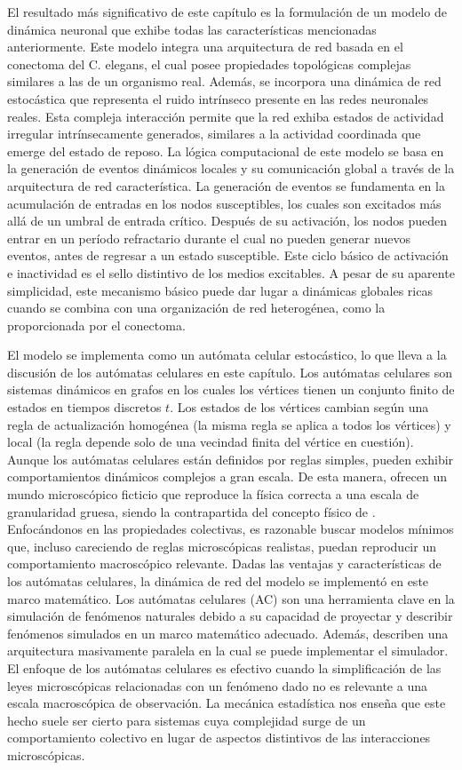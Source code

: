 El resultado más significativo de este capítulo es la formulación de un modelo de dinámica neuronal que exhibe todas las características mencionadas anteriormente. Este modelo integra una arquitectura de red basada en el conectoma del C. elegans, el cual posee propiedades topológicas complejas similares a las de un organismo real. Además, se incorpora una dinámica de red estocástica que representa el ruido intrínseco presente en las redes neuronales reales. Esta compleja interacción permite que la red exhiba estados de actividad irregular intrínsecamente generados, similares a la actividad coordinada que emerge del estado de reposo. La lógica computacional de este modelo se basa en la generación de eventos dinámicos locales y su comunicación global a través de la arquitectura de red característica. La generación de eventos se fundamenta en la acumulación de entradas en los nodos susceptibles, los cuales son excitados más allá de un umbral de entrada crítico. Después de su activación, los nodos pueden entrar en un período refractario durante el cual no pueden generar nuevos eventos, antes de regresar a un estado susceptible. Este ciclo básico de activación e inactividad es el sello distintivo de los medios excitables. A pesar de su aparente simplicidad, este mecanismo básico puede dar lugar a dinámicas globales ricas cuando se combina con una organización de red heterogénea, como la proporcionada por el conectoma.

El modelo se implementa como un autómata celular estocástico, lo que lleva a la discusión de los autómatas celulares en este capítulo. Los autómatas celulares son sistemas dinámicos en grafos en los cuales los vértices tienen un conjunto finito de estados en tiempos discretos $t$. Los estados de los vértices cambian según una regla de actualización homogénea (la misma regla se aplica a todos los vértices) y local (la regla depende solo de una vecindad finita del vértice en cuestión). Aunque los autómatas celulares están definidos por reglas simples, pueden exhibir comportamientos dinámicos complejos a gran escala. De esta manera, ofrecen un mundo microscópico ficticio que reproduce la física correcta a una escala de granularidad gruesa, siendo la contrapartida del concepto físico de . Enfocándonos en las propiedades colectivas, es razonable buscar modelos mínimos que, incluso careciendo de reglas microscópicas realistas, puedan reproducir un comportamiento macroscópico relevante. Dadas las ventajas y características de los autómatas celulares, la dinámica de red del modelo se implementó en este marco matemático. Los autómatas celulares (AC) son una herramienta clave en la simulación de fenómenos naturales debido a su capacidad de proyectar y describir fenómenos simulados en un marco matemático adecuado. Además, describen una arquitectura masivamente paralela en la cual se puede implementar el simulador. El enfoque de los autómatas celulares es efectivo cuando la simplificación de las leyes microscópicas relacionadas con un fenómeno dado no es relevante a una escala macroscópica de observación. La mecánica estadística nos enseña que este hecho suele ser cierto para sistemas cuya complejidad surge de un comportamiento colectivo en lugar de aspectos distintivos de las interacciones microscópicas.


